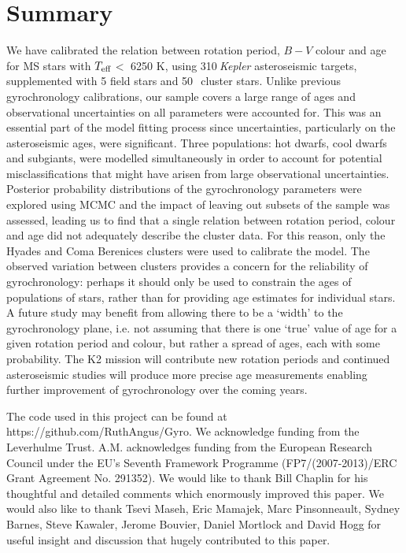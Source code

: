 \documentclass[useAMS, usenatbib]{mn2e}
\newcommand{\teff}{$T_{\rm{eff}}$}
\newcommand{\nastero}{310}
\newcommand{\nHC}{50~}
\begin{document}
\section{Summary}
\label{sec:conclusions}

We have calibrated the relation between rotation period, $B-V$ colour and age
for MS stars with \teff$<$ 6250 K, using \nastero$~${\it Kepler} asteroseismic
targets, supplemented with 5 field stars and \nHC$~$cluster stars.
Unlike previous gyrochronology calibrations, our sample covers a large range
of ages and observational uncertainties on all parameters were accounted for.
This was an essential part of the model fitting process since
uncertainties, particularly on the asteroseismic ages, were significant.
Three populations: hot dwarfs, cool dwarfs and subgiants, were modelled
simultaneously in order to account for potential misclassifications that
might have arisen from large observational uncertainties.
Posterior probability distributions of the gyrochronology parameters were
explored using MCMC and the impact of leaving out subsets of the sample was
assessed, leading us to find that a single relation between rotation period,
colour and age did not adequately describe the cluster data.
For this reason, only the Hyades and Coma Berenices clusters were used to
calibrate the model.
The observed variation between clusters provides a concern for the reliability
of gyrochronology: perhaps it should only be used to constrain the ages of
populations of stars, rather than for providing age estimates for individual
stars.
A future study may benefit from allowing there to be a `width' to the
gyrochronology plane, i.e. not assuming that there is one `true' value of age
for a given rotation period and colour, but rather a spread of ages, each with
some probability.
The K2 mission will contribute new rotation periods and continued
asteroseismic studies will produce more precise age measurements enabling
further improvement of gyrochronology over the coming years.

The code used in this project can be found at
https://github.com/RuthAngus/Gyro.
We acknowledge funding from the Leverhulme Trust.
A.M. acknowledges funding from the European Research Council under the EU’s
Seventh Framework Programme (FP7/(2007-2013)/ERC Grant Agreement No. 291352).
We would like to thank Bill Chaplin for his thoughtful and detailed comments
which enormously improved this paper.
We would also like to thank Tsevi Maseh, Eric Mamajek, Marc Pinsonneault,
Sydney Barnes, Steve Kawaler, Jerome Bouvier, Daniel Mortlock and David Hogg
for useful insight and discussion that hugely contributed to this paper.



\end{document}
